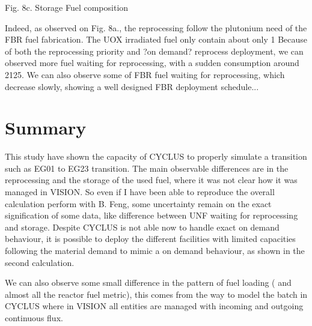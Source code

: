 \documentclass[12pt]{article}
\begin{document}
Fig. 8c. Storage Fuel composition

Indeed, as observed on Fig. 8a., the reprocessing follow the plutonium need of the FBR fuel fabrication. The UOX irradiated fuel only contain about only 1 %
Because of both the reprocessing priority and ?on demand? reprocess deployment, we can observed more fuel waiting for reprocessing, with a sudden consumption around 2125. We can also observe some of FBR fuel waiting for reprocessing, which decrease slowly, showing a well designed FBR deployment schedule...
\section{Summary}
This study have shown the capacity of CYCLUS to properly simulate a transition such as EG01 to EG23 transition.
The main observable differences are in the reprocessing and the storage of the used fuel, where it was not clear how it was managed in VISION. So even if I have been able to reproduce the overall calculation perform with B. Feng, some uncertainty remain on the exact signification of some data, like difference between UNF waiting for reprocessing and storage.
Despite CYCLUS is not able now to handle exact on demand behaviour, it is possible to deploy the different facilities with limited capacities following the material demand to mimic a on demand behaviour, as shown in the second calculation.

We can also observe some small difference in the pattern of fuel loading ( and almost all the reactor fuel metric), this comes from the way to model the batch in CYCLUS where in VISION all entities are managed with incoming and outgoing continuous flux.










\end{document}
